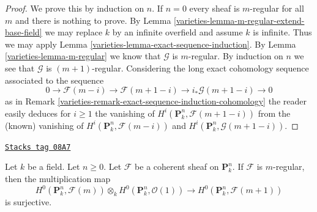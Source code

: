 \begin{proof}

We prove this by induction on $n$. If $n = 0$ every sheaf is $m$-regular
for all $m$ and there is nothing to prove. By
Lemma \ref{varieties-lemma-m-regular-extend-base-field} we may replace $k$
by an infinite overfield and assume $k$ is infinite.
Thus we may apply Lemma \ref{varieties-lemma-exact-sequence-induction}.
By Lemma \ref{varieties-lemma-m-regular} we know that $\mathcal{G}$ is
$m$-regular. By induction on $n$ we see that $\mathcal{G}$ is
$(m + 1)$-regular. Considering the long exact cohomology sequence
associated to the sequence
$$
0 \to \mathcal{F}(m - i) \to \mathcal{F}(m + 1 - i)
\to i_*\mathcal{G}(m + 1 - i) \to 0
$$
as in Remark \ref{varieties-remark-exact-sequence-induction-cohomology}
the reader easily deduces for $i \geq 1$ the vanishing of
$H^i(\mathbf{P}^n_k, \mathcal{F}(m + 1 - i))$ from the (known) vanishing of
$H^i(\mathbf{P}^n_k, \mathcal{F}(m - i))$ and
$H^i(\mathbf{P}^n_k, \mathcal{G}(m + 1 - i))$.
\end{proof}

\begin{lemma}
\label{varieties-lemma-m-regular-multiply}
\href{https://stacks.math.columbia.edu/tag/08A7}{\texttt{Stacks tag 08A7}}

Let $k$ be a field. Let $n \geq 0$.
Let $\mathcal{F}$ be a coherent sheaf on $\mathbf{P}^n_k$.
If $\mathcal{F}$ is $m$-regular, then the multiplication map
$$
H^0(\mathbf{P}^n_k, \mathcal{F}(m)) \otimes_k
H^0(\mathbf{P}^n_k, \mathcal{O}(1))
\longrightarrow
H^0(\mathbf{P}^n_k, \mathcal{F}(m + 1))
$$
is surjective.
\end{lemma}

